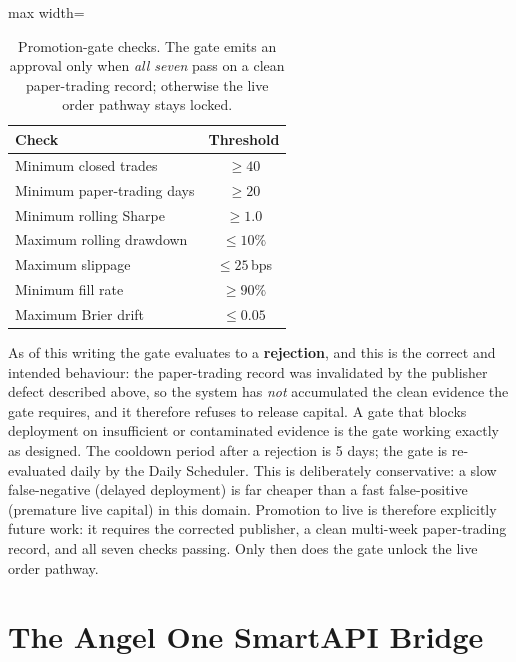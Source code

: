 \begin{table}[H]
\centering
\caption{Promotion-gate checks. The gate emits an approval only when \emph{all seven} pass on a clean paper-trading record; otherwise the live order pathway stays locked.}
\label{tab:promotion_gate}
\renewcommand{\arraystretch}{1.35}
\begin{adjustbox}{max width=\textwidth}
\begin{tabular}{l c}
\toprule
\textbf{Check} & \textbf{Threshold} \\
\midrule
Minimum closed trades      & $\geq 40$   \\
Minimum paper-trading days & $\geq 20$   \\
Minimum rolling Sharpe     & $\geq 1.0$  \\
Maximum rolling drawdown   & $\leq 10\%$ \\
Maximum slippage           & $\leq 25$\,bps \\
Minimum fill rate          & $\geq 90\%$ \\
Maximum Brier drift        & $\leq 0.05$ \\
\bottomrule
\end{tabular}
\end{adjustbox}
\end{table}

As of this writing the gate evaluates to a \textbf{rejection}, and this is the correct and intended behaviour: the paper-trading record was invalidated by the publisher defect described above, so the system has \emph{not} accumulated the clean evidence the gate requires, and it therefore refuses to release capital. A gate that blocks deployment on insufficient or contaminated evidence is the gate working exactly as designed. The cooldown period after a rejection is 5 days; the gate is re-evaluated daily by the Daily Scheduler. This is deliberately conservative: a slow false-negative (delayed deployment) is far cheaper than a fast false-positive (premature live capital) in this domain. Promotion to live is therefore explicitly future work: it requires the corrected publisher, a clean multi-week paper-trading record, and all seven checks passing. Only then does the gate unlock the live order pathway.

\section{The Angel One SmartAPI Bridge}

